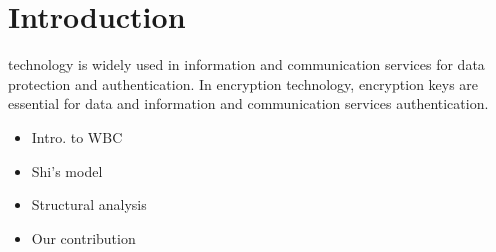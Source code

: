 \documentclass{ieeeaccess}
\begin{document}
\titlepgskip=-15pt

\maketitle

\section{Introduction}
\label{sec:introduction}
technology is widely used in information and communication services for data protection and authentication. 
In encryption technology, encryption keys are essential for data and information and communication services authentication. 

\begin{itemize}
\item Intro. to WBC
\item Shi's model
\item Structural analysis
\item Our contribution
\end{itemize}
\end{document}

